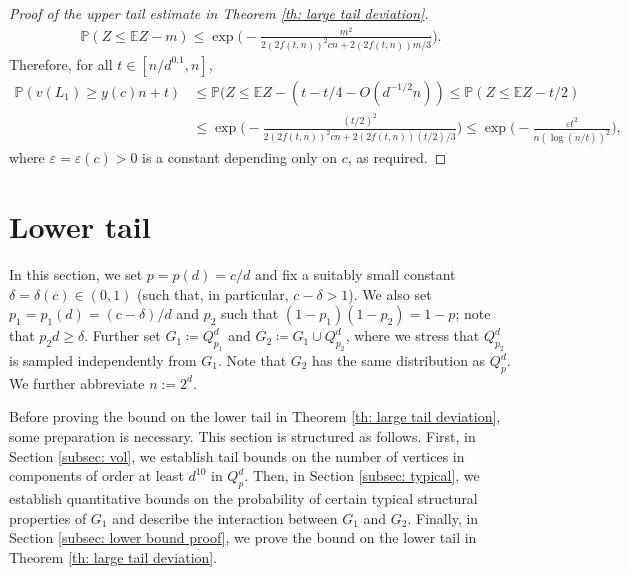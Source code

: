 \documentclass[reqno,final,a4paper]{amsart}
\theoremstyle{definition}
\def\eps{\varepsilon}
\newcommand{\1}{\mathbbm{1}}
\begin{document}
\begin{proof}[Proof of the upper tail estimate in Theorem \ref{th: large tail deviation}]
\begin{align*}
    \mathbb{P}\left(Z\le \mathbb EZ-m\right)\le \exp\bigg(-\frac{m^2}{2 (2f(t,n))^2 cn + 2 (2f(t,n)) m/3}\bigg).
\end{align*}
Therefore, for all $t\in [n/d^{0.1},n]$,
\begin{align*}
\mathbb{P}(v(L_1)\ge y(c)n+t) 
&\le \mathbb{P}(Z\le \mathbb EZ - (t-t/4-O(d^{-1/2}n))\le \mathbb{P}(Z\le \mathbb EZ-t/2)\\
&\le\exp\bigg(-\frac{(t/2)^2}{2 (2f(t,n))^2 cn + 2 (2f(t,n)) (t/2)/3}\bigg)\leq \exp\bigg(-\frac{\eps t^2}{n (\log(n/t))^2}\bigg),
\end{align*}
where $\eps=\eps(c)>0$ is a constant depending only on $c$, as required.
\end{proof}

\section{Lower tail}\label{s: lower tail}
In this section, we set $p=p(d)=c/d$ and fix a suitably small constant $\delta = \delta(c)\in (0,1)$ (such that, in particular, $c-\delta>1$).
We also set $p_1=p_1(d)=(c-\delta)/d$ and $p_2$ such that $(1-p_1)(1-p_2)=1-p$; note that $p_2d\ge \delta$. 
Further set $G_1\coloneqq Q^d_{p_1}$ and $G_2\coloneqq G_1\cup Q^d_{p_2}$, where we stress that $Q^d_{p_2}$ is sampled independently from $G_1$. Note that $G_2$ has the same distribution as $Q^d_p$. We further abbreviate $n:=2^d$.

Before proving the bound on the lower tail in Theorem \ref{th: large tail deviation}, some preparation is necessary. This section is structured as follows. 
First, in Section \ref{subsec: vol}, we establish tail bounds on the number of vertices in components of order at least $d^{10}$ in $Q^d_p$. Then, in Section \ref{subsec: typical}, we establish quantitative bounds on the probability of certain typical structural properties of $G_1$ and describe the interaction between $G_1$ and $G_2$. Finally, in Section \ref{subsec: lower bound proof}, we prove the bound on the lower tail in Theorem \ref{th: large tail deviation}.
\end{document}
